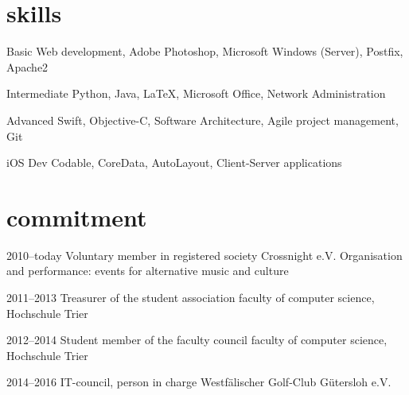 \documentclass[]{friggeri-cv} %
\begin{document}

\section{skills}

\begin{entrylist}


\entry
{Basic}
{Web development, Adobe Photoshop, Microsoft Windows (Server), Postfix, Apache2}
{}

\entry
{Intermediate}
{Python, Java, LaTeX, Microsoft Office, Network Administration}
{}

\entry
{Advanced}
{Swift, Objective-C, Software Architecture, Agile project management, Git}
{}

\entry
{iOS Dev}
{Codable, CoreData, AutoLayout, Client-Server applications}
{}
\\
\end{entrylist}


\section{commitment}

\begin{entrylist}


\entry
{2010--today}
{Voluntary member in registered society Crossnight e.V.}
{}
{Organisation and performance: events for alternative music and culture}


\entry
{2011--2013}
{Treasurer of the student association}
{}
{faculty of computer science, Hochschule Trier}


\entry
{2012--2014}
{Student member of the faculty council}
{}
{faculty of computer science, Hochschule Trier}


\entry
{2014--2016}
{IT-council, person in charge}
{}
{Westf\"{a}lischer Golf-Club G\"{u}tersloh e.V.}

\\
\end{entrylist}
\end{document}
